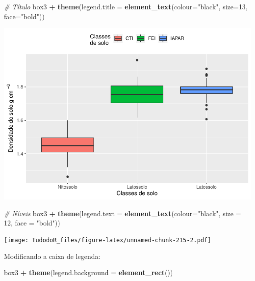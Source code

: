 \documentclass[
]{book}
\newenvironment{Shaded}{\begin{snugshade}}{\end{snugshade}}
\newcommand{\CommentTok}[1]{\textcolor[rgb]{0.56,0.35,0.01}{\textit{#1}}}
\newcommand{\DataTypeTok}[1]{\textcolor[rgb]{0.13,0.29,0.53}{#1}}
\newcommand{\DecValTok}[1]{\textcolor[rgb]{0.00,0.00,0.81}{#1}}
\newcommand{\KeywordTok}[1]{\textcolor[rgb]{0.13,0.29,0.53}{\textbf{#1}}}
\newcommand{\NormalTok}[1]{#1}
\newcommand{\OperatorTok}[1]{\textcolor[rgb]{0.81,0.36,0.00}{\textbf{#1}}}
\newcommand{\StringTok}[1]{\textcolor[rgb]{0.31,0.60,0.02}{#1}}
\begin{document}
\begin{Shaded}
\begin{Highlighting}[]
\CommentTok{# Título}
\NormalTok{box3 }\OperatorTok{+}\StringTok{ }\KeywordTok{theme}\NormalTok{(}\DataTypeTok{legend.title =} \KeywordTok{element_text}\NormalTok{(}\DataTypeTok{colour=}\StringTok{"black"}\NormalTok{, }\DataTypeTok{size=}\DecValTok{13}\NormalTok{, }\DataTypeTok{face=}\StringTok{"bold"}\NormalTok{))}
\end{Highlighting}
\end{Shaded}

\includegraphics{TudodoR_files/figure-latex/unnamed-chunk-215-1.pdf}

\begin{Shaded}
\begin{Highlighting}[]
\CommentTok{# Níveis}
\NormalTok{box3 }\OperatorTok{+}\StringTok{ }\KeywordTok{theme}\NormalTok{(}\DataTypeTok{legend.text =} \KeywordTok{element_text}\NormalTok{(}\DataTypeTok{colour=}\StringTok{"black"}\NormalTok{, }\DataTypeTok{size =} \DecValTok{12}\NormalTok{, }\DataTypeTok{face =} \StringTok{"bold"}\NormalTok{))}
\end{Highlighting}
\end{Shaded}

\texttt{[image: TudodoR\_files/figure-latex/unnamed-chunk-215-2.pdf]}

Modificando a caixa de legenda:

\begin{Shaded}
\begin{Highlighting}[]
\NormalTok{box3 }\OperatorTok{+}\StringTok{ }\KeywordTok{theme}\NormalTok{(}\DataTypeTok{legend.background =} \KeywordTok{element_rect}\NormalTok{())}
\end{Highlighting}
\end{Shaded}
\end{document}

